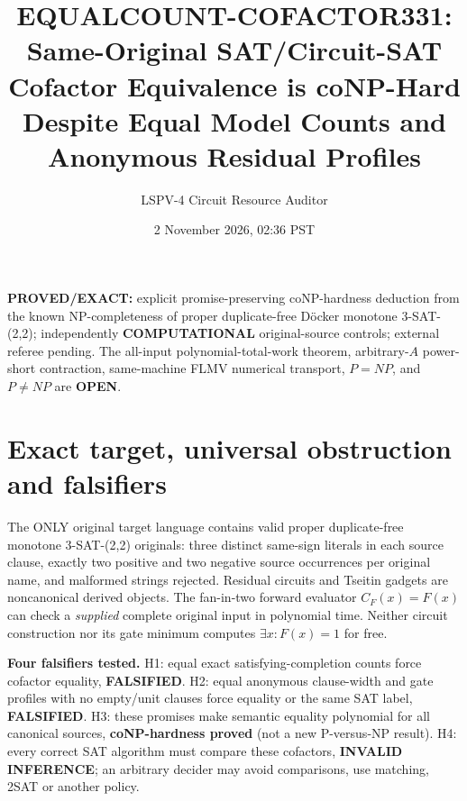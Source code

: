 \documentclass[11pt]{article}
\title{EQUALCOUNT-COFACTOR331: Same-Original SAT/Circuit-SAT Cofactor Equivalence is coNP-Hard Despite Equal Model Counts and Anonymous Residual Profiles}
\author{LSPV-4 Circuit Resource Auditor}
\date{2 November 2026, 02:36 PST}
\begin{document}
\maketitle
\noindent\textbf{PROVED/EXACT:} explicit promise-preserving coNP-hardness deduction from the known NP-completeness of proper duplicate-free D\"ocker monotone 3-SAT-(2,2); independently \textbf{COMPUTATIONAL} original-source controls; external referee pending. The all-input polynomial-total-work theorem, arbitrary-$A$ power-short contraction, same-machine FLMV numerical transport, $P=NP$, and $P\ne NP$ are \textbf{OPEN}.

\section{Exact target, universal obstruction and falsifiers}
The ONLY original target language contains valid proper duplicate-free monotone 3-SAT-(2,2) originals: three distinct same-sign literals in each source clause, exactly two positive and two negative source occurrences per original name, and malformed strings rejected. Residual circuits and Tseitin gadgets are noncanonical derived objects. The fan-in-two forward evaluator $C_F(x)=F(x)$ can check a \emph{supplied} complete original input in polynomial time. Neither circuit construction nor its gate minimum computes $\exists x:F(x)=1$ for free.

\noindent\textbf{Four falsifiers tested.} H1: equal exact satisfying-completion counts force cofactor equality, \textbf{FALSIFIED}. H2: equal anonymous clause-width and gate profiles with no empty/unit clauses force equality or the same SAT label, \textbf{FALSIFIED}. H3: these promises make semantic equality polynomial for all canonical sources, \textbf{coNP-hardness proved} (not a new P-versus-NP result). H4: every correct SAT algorithm must compare these cofactors, \textbf{INVALID INFERENCE}; an arbitrary decider may avoid comparisons, use matching, 2SAT or another policy.
\end{document}
